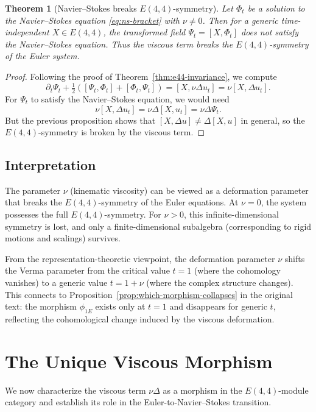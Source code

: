 \documentclass[reqno,10pt]{amsart}
\theoremstyle{plain}
\newtheorem{theorem}{Theorem}[section]
\theoremstyle{definition}
\def\gE{E(4,4)}
\begin{document}
\begin{theorem}[Navier--Stokes breaks $\gE$-symmetry]
Let $\Phi_t$ be a solution to the Navier--Stokes equation \eqref{eq:ns-bracket} with $\nu\neq 0$. Then for a generic time-independent $X\in\gE$, the transformed field $\Psi_t = [X,\Phi_t]$ does \emph{not} satisfy the Navier--Stokes equation. Thus the viscous term breaks the $\gE$-symmetry of the Euler system.
\end{theorem}

\begin{proof}
Following the proof of Theorem~\ref{thm:e44-invariance}, we compute
\[
  \partial_t\Psi_t + \tfrac{1}{2}([\Psi_t,\Phi_t] + [\Phi_t,\Psi_t]) = [X, \nu\Delta u_t] = \nu[X,\Delta u_t].
\]
For $\Psi_t$ to satisfy the Navier--Stokes equation, we would need
\[
  \nu[X,\Delta u_t] = \nu\Delta[X, u_t] = \nu\Delta \Psi_t.
\]
But the previous proposition shows that $[X,\Delta u] \neq \Delta[X,u]$ in general, so the $\gE$-symmetry is broken by the viscous term.
\end{proof}

\subsection{Interpretation}

The parameter $\nu$ (kinematic viscosity) can be viewed as a deformation parameter that breaks the $\gE$-symmetry of the Euler equations. At $\nu=0$, the system possesses the full $\gE$-symmetry. For $\nu>0$, this infinite-dimensional symmetry is lost, and only a finite-dimensional subalgebra (corresponding to rigid motions and scalings) survives.

From the representation-theoretic viewpoint, the deformation parameter $\nu$ shifts the Verma parameter from the critical value $t=1$ (where the cohomology vanishes) to a generic value $t=1+\nu$ (where the complex structure changes). This connects to Proposition~\ref{prop:which-morphism-collapses} in the original text: the morphism $\phi_{1E}$ exists only at $t=1$ and disappears for generic $t$, reflecting the cohomological change induced by the viscous deformation.

\section{The Unique Viscous Morphism}

We now characterize the viscous term $\nu\Delta$ as a morphism in the $\gE$-module category and establish its role in the Euler-to-Navier--Stokes transition.
\end{document}
